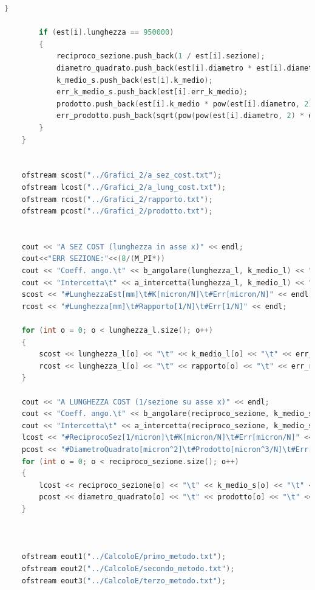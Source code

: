 \documentclass[a4paper,11pt,oneside]{article}
\begin{document}
\begin{lstlisting}[language=C++, label=lst:seconda_parte, caption=seconda\_parte]
		}

		if (est[i].lunghezza == 950000) 
		{
			reciproco_sezione.push_back(1 / est[i].sezione);
			diametro_quadrato.push_back(est[i].diametro * est[i].diametro); 
			k_medio_s.push_back(est[i].k_medio);
			err_k_medio_s.push_back(est[i].err_k_medio);
			prodotto.push_back(est[i].k_medio * pow(est[i].diametro, 2));
			err_prodotto.push_back(sqrt(pow(pow(est[i].diametro, 2) * est[i].err_k_medio, 2) + (pow((2 * est[i].k_medio * est[i].diametro), 2) * pow(est[i].err_diametro, 2))));
		}
	}

	
	ofstream scost("../Grafici_2/a_sez_cost.txt");
	ofstream lcost("../Grafici_2/a_lung_cost.txt");
	ofstream rcost("../Grafici_2/rapporto.txt");
	ofstream pcost("../Grafici_2/prodotto.txt");
	
	
	cout << "A SEZ COST (lunghezza in asse x)" << endl;
	cout<<"ERR SEZIONE:"<<(8/(M_PI*))
	cout << "Coeff. ango.\t" << b_angolare(lunghezza_l, k_medio_l) << " +/- " << sigma_b_y_uguali(lunghezza_l, err_k_medio_l[0]) << endl;
	cout << "Intercetta\t" << a_intercetta(lunghezza_l, k_medio_l) << " +/- " << sigma_a_y_uguali(lunghezza_l, err_k_medio_l[0]) << endl;
	scost << "#LunghezzaEst[mm]\t#K[micron/N]\t#Err[micron/N]" << endl;
	rcost << "#Lunghezza[mm]\t#Rapporto[1/N]\t#Err[1/N]" << endl;

	for (int o = 0; o < lunghezza_l.size(); o++)
	{
		scost << lunghezza_l[o] << "\t" << k_medio_l[o] << "\t" << err_k_medio_l[o] << endl;
		rcost << lunghezza_l[o] << "\t" << rapporto[o] << "\t" << err_rapporto[o] << endl;
	}
	
	cout << "A LUNGHEZZA COST (1/sezione su asse x)" << endl;
	cout << "Coeff. ango.\t" << b_angolare(reciproco_sezione, k_medio_s) << " +/- " << sigma_b_y_uguali(reciproco_sezione, err_k_medio_l[0]) << endl;
	cout << "Intercetta\t" << a_intercetta(reciproco_sezione, k_medio_s) << " +/- " << sigma_a_y_uguali(reciproco_sezione, err_k_medio_l[0]) << endl;
	lcost << "#ReciprocoSez[1/micron]\t#K[micron/N]\t#Err[micron/N]" << endl;
	pcost << "#DiametroQuadrato[micron^2]\t#Prodotto[micron^3/N]\t#Err[micron^3/N]" << endl;
	for (int o = 0; o < reciproco_sezione.size(); o++)
	{
		lcost << reciproco_sezione[o] << "\t" << k_medio_s[o] << "\t" << err_k_medio_s[o] << "\t" << endl;
		pcost << diametro_quadrato[o] << "\t" << prodotto[o] << "\t" << err_prodotto[o] << endl;
	}
	

	
	ofstream eout1("../CalcoloE/primo_metodo.txt");
	ofstream eout2("../CalcoloE/secondo_metodo.txt");
	ofstream eout3("../CalcoloE/terzo_metodo.txt");


\end{lstlisting}
\end{document}
